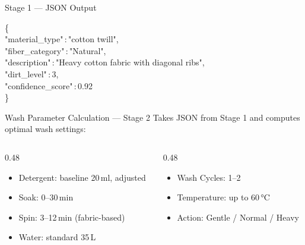 \documentclass[aspectratio=169]{beamer}
\begin{document}
\begin{frame}{Stage 1 — JSON Output}
\begin{tcolorbox}[darkcode,
  title={\faCode\enspace Output JSON — Stage 1: Fabric Analysis}]
\color{white}\ttfamily\small
\{\\[2pt]
\quad\textcolor{CodeYellow}{"material\_type"}\,:\,\textcolor{CodeGreen}{"cotton twill"},\\[2pt]
\quad\textcolor{CodeYellow}{"fiber\_category"}\,:\,\textcolor{CodeGreen}{"Natural"},\\[2pt]
\quad\textcolor{CodeYellow}{"description"}\,:\,\textcolor{CodeGreen}{"Heavy cotton fabric with diagonal ribs"},\\[2pt]
\quad\textcolor{CodeYellow}{"dirt\_level"}\,:\,\textcolor{CodePurple}{3},\\[2pt]
\quad\textcolor{CodeYellow}{"confidence\_score"}\,:\,\textcolor{CodePurple}{0.92}\\[2pt]
\}
\end{tcolorbox}
\end{frame}

\begin{frame}{Wash Parameter Calculation — Stage 2}
\vspace{0.05cm}
\small Takes JSON from Stage 1 and computes optimal wash settings:
\vspace{0.25cm}

\begin{columns}[T]
\begin{column}{0.48\textwidth}
\begin{tcolorbox}[mycard, title={\faFlask\enspace Wash Parameters}]
\small
\begin{itemize}
  \item Detergent: baseline 20\,ml, adjusted
  \item Soak: 0–30\,min
  \item Spin: 3–12\,min (fabric-based)
  \item Water: standard 35\,L
\end{itemize}
\end{tcolorbox}
\end{column}
\begin{column}{0.48\textwidth}
\begin{tcolorbox}[accentcard, title={\faSlidersH\enspace Cycle Controls}]
\small
\begin{itemize}
  \item Wash Cycles: 1–2
  \item Temperature: up to 60\,°C
  \item Action: Gentle / Normal / Heavy
\end{itemize}
\end{tcolorbox}
\end{column}
\end{columns}
\end{frame}
\end{document}
